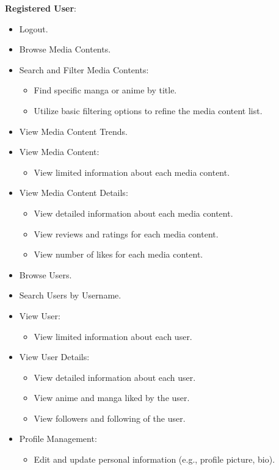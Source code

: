 \textbf{Registered User}:

\begin{itemize}
    \item Logout.
    \item Browse Media Contents.
    \item Search and Filter Media Contents:
    \begin{itemize}
        \item Find specific manga or anime by title.
        \item Utilize basic filtering options to refine the media content list.
    \end{itemize}
    \item View Media Content Trends.
    \item View Media Content:
    \begin{itemize}
        \item View limited information about each media content.
    \end{itemize} 
    \item View Media Content Details:
    \begin{itemize}
        \item View detailed information about each media content.
        \item View reviews and ratings for each media content.
        \item View number of likes for each media content.
    \end{itemize}
    \item Browse Users.
    \item Search Users by Username.
    \item View User:
    \begin{itemize}
        \item View limited information about each user.
    \end{itemize} 
    \item View User Details:
    \begin{itemize}
        \item View detailed information about each user.
        \item View anime and manga liked by the user.
        \item View followers and following of the user.
    \end{itemize}
    \item Profile Management:
    \begin{itemize}
        \item Edit and update personal information (e.g., profile picture, bio).

\end{itemize}
\end{itemize}
